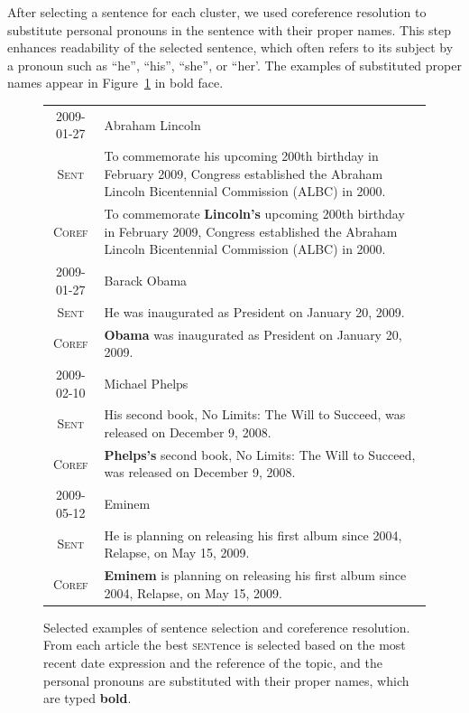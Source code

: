 \documentclass[11pt]{article}
\newcommand{\war}[1]{{\sf\small #1}}
\begin{document}
After selecting a sentence for each cluster, we used coreference resolution to substitute personal pronouns in the sentence with their proper names.
This step enhances readability of the selected sentence, which often refers to its subject by a pronoun such as ``he'', ``his'', ``she'', or ``her'.
The examples of substituted proper names appear in Figure~\ref{fig:sentence-selection} in bold face.

\begin{figure}
\begin{tabularx}{\linewidth}{cX}
2009-01-27 & \war{Abraham Lincoln} \\
\textsc{Sent} & \small To commemorate his upcoming 200th birthday in February 2009, Congress established the Abraham Lincoln Bicentennial Commission (ALBC) in 2000. \\
\textsc{Coref} & \small To commemorate \textbf{Lincoln's} upcoming 200th birthday in February 2009, Congress established the Abraham Lincoln Bicentennial Commission (ALBC) in 2000. \\
\hline
2009-01-27 & \war{Barack Obama} \\
\textsc{Sent} & \small He was inaugurated as President on January 20, 2009.\\
\textsc{Coref} & \small \textbf{Obama} was inaugurated as President on January 20, 2009.\\
\hline
2009-02-10 & \war{Michael Phelps} \\
\textsc{Sent} & \small His second book, No Limits: The Will to Succeed, was released on December 9, 2008.\\
\textsc{Coref} & \small \textbf{Phelps's} second book, No Limits: The Will to Succeed, was released on December 9, 2008.\\
\hline
2009-05-12 & \war{Eminem}\\
\textsc{Sent} & \small He is planning on releasing his first album since 2004, Relapse, on May 15, 2009.\\
\textsc{Coref} & \small \textbf{Eminem} is planning on releasing his first album since 2004, Relapse, on May 15, 2009.\\
\end{tabularx}
\label{fig:sentence-selection}
\caption{Selected examples of sentence selection and coreference resolution.
From each \war{article} the best \textsc{sent}ence is selected
based on the most recent date expression and the reference of the topic,
and the personal pronouns are substituted with their proper names,
which are typed \textbf{bold}.}
\end{figure}
\end{document}
